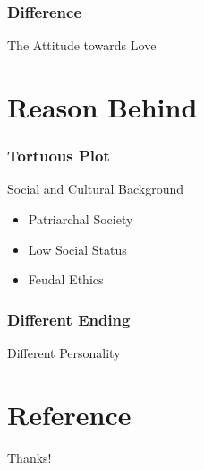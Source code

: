 \documentclass{beamer}
\begin{document}
\begin{frame}
    \frametitle{Difference}
    \Huge
    \begin{center}
        The Attitude towards Love
    \end{center}
\end{frame}

\section{Reason Behind}

\begin{frame}
    \frametitle{Tortuous Plot}
    \Large
    \begin{block}{Social and Cultural Background}
        \begin{itemize}
            \item Patriarchal Society
            \item Low Social Status
            \item Feudal Ethics
        \end{itemize} 
    \end{block}
\end{frame}

\begin{frame}
    \frametitle{Different Ending}
    \begin{center}
        \Huge
        Different Personality
    \end{center}
\end{frame}

\section{Reference}

\begin{frame}[allowframebreaks]
    
    
\end{frame}

\begin{frame}
    \begin{center}
        {\Huge\calligra Thanks!}\cite{origin}
    \end{center}
\end{frame}
\end{document}
